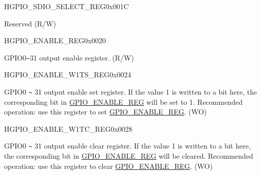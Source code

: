 \begin{register}{H}{GPIO\_SDIO\_SELECT\_REG}{0x{}001C}\label{regdesc:GPIOSDIOSELECTREG}
%
%
\regnewline%
\begin{regdesc}\begin{reglist}
\label{fielddesc:GPIOSDIOSEL}\item [GPIO\_SDIO\_SEL] Reserved (R/W)
\end{reglist}\end{regdesc}
\end{register}


\begin{register}{H}{GPIO\_ENABLE\_REG}{0x{}0020}\label{regdesc:GPIOENABLEREG}
%
\regnewline%
\begin{regdesc}\begin{reglist}
\label{fielddesc:GPIOENABLEDATA}\item [GPIO\_ENABLE\_DATA] GPIO0\verb+~+31 output enable register. (R/W)
\end{reglist}\end{regdesc}
\end{register}


\begin{register}{H}{GPIO\_ENABLE\_W1TS\_REG}{0x{}0024}\label{regdesc:GPIOENABLEW1TSREG}
%
\regnewline%
\begin{regdesc}\begin{reglist}
\label{fielddesc:GPIOENABLEW1TS}\item [GPIO\_ENABLE\_W1TS] GPIO0 \verb+~+ 31 output enable set register. If the value 1 is written to a bit here, the corresponding bit in \hyperref[regdesc:GPIOENABLEREG]{GPIO\_ENABLE\_REG} will be set to 1. Recommended operation: use this register to set \hyperref[regdesc:GPIOENABLEREG]{GPIO\_ENABLE\_REG}. (WO)
\end{reglist}\end{regdesc}
\end{register}


\begin{register}{H}{GPIO\_ENABLE\_W1TC\_REG}{0x{}0028}\label{regdesc:GPIOENABLEW1TCREG}
%
\regnewline%
\begin{regdesc}\begin{reglist}
\label{fielddesc:GPIOENABLEW1TC}\item [GPIO\_ENABLE\_W1TC] GPIO0 \verb+~+ 31 output enable clear register. If the value 1 is written to a bit here, the corresponding bit in \hyperref[regdesc:GPIOENABLEREG]{GPIO\_ENABLE\_REG} will be cleared. Recommended operation: use this register to clear \hyperref[regdesc:GPIOENABLEREG]{GPIO\_ENABLE\_REG}. (WO)
\end{reglist}\end{regdesc}
\end{register}


